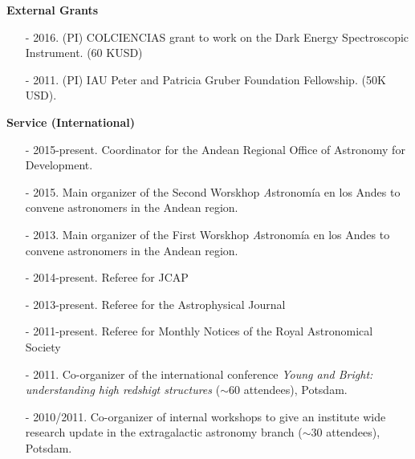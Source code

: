 \documentclass[letterpaper,11pt,onecolumn]{article}
\begin{document}
{\bf External Grants}
\begin{itemize}
\item[-] 2016. (PI) COLCIENCIAS grant to work on the Dark
  Energy Spectroscopic Instrument. (60 KUSD)
\item[-] 2011. (PI) IAU Peter and Patricia Gruber Foundation
  Fellowship. (50K USD).


\end{itemize}

{\bf Service (International)}
\begin{itemize}
\item[-] 2015-present. Coordinator for the Andean Regional Office of
  Astronomy for Development.
\item[-] 2015. Main organizer of the Second Worskhop {\textit Astronom\'ia en
  los Andes} to convene astronomers in the Andean region.  
\item[-] 2013. Main organizer of the First Worskhop {\textit Astronom\'ia en
  los Andes} to convene astronomers in the Andean region.  
\item[-] 2014-present. Referee for JCAP  %
\item[-] 2013-present. Referee for the Astrophysical Journal %
\item[-] 2011-present. Referee for Monthly Notices of the Royal
  Astronomical Society %
\item[-] 2011. Co-organizer of the international conference {\it Young
  and Bright: understanding high redshigt structures} ($\sim 60$
  attendees), Potsdam. 
\item[-] 2010/2011. Co-organizer of internal workshops to give an
  institute wide research update in the extragalactic astronomy branch
  ($\sim 30$ attendees), Potsdam. 
\end{itemize}
\end{document}
